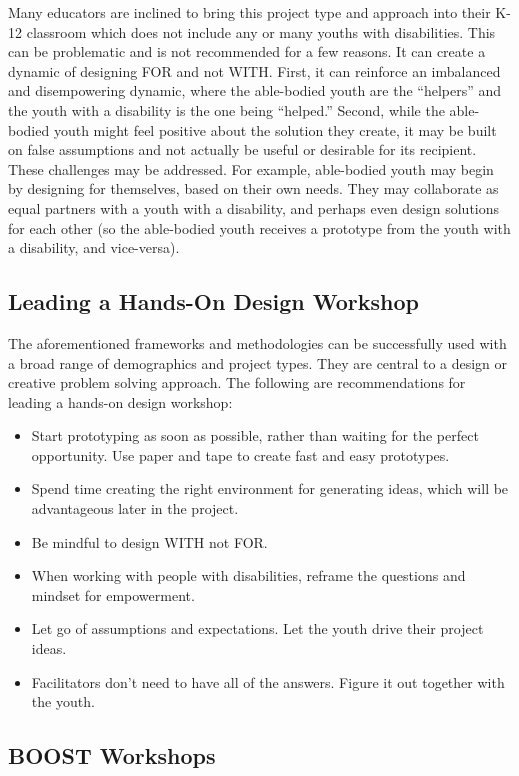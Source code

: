 \documentclass[11.5pt]{sig-alternate} %
\begin{document}
\begin{large}
Many educators are inclined to bring this project type and approach into their K-12 classroom which does not include any or many youths with disabilities. This can be problematic and is not recommended for a few reasons. It can create a dynamic of designing FOR and not WITH. 
First, it can reinforce an imbalanced and disempowering dynamic, where the able-bodied youth are the “helpers” and the youth with a disability is the one being “helped.” Second, while the able-bodied youth might feel positive about the solution they create, it may be built on false assumptions and not actually be useful or desirable for its recipient. 
These challenges may be addressed. For example, able-bodied youth may begin by designing for themselves, based on their own needs. They may collaborate as equal partners with a youth with a disability, and perhaps even design solutions for each other (so the able-bodied youth receives a prototype from the youth with a disability, and vice-versa).  

\subsection*{Leading a Hands-On Design Workshop}

The aforementioned frameworks and methodologies can be successfully used with a broad range of demographics and project types. They are central to a design or creative problem solving approach.  
The following are recommendations for leading a hands-on design workshop:
\begin{itemize}
\item 	Start prototyping as soon as possible, rather than waiting for the perfect opportunity. Use paper and tape to create fast and easy prototypes. 
\item 	Spend time creating the right environment for generating ideas, which will be advantageous later in the project. 
\item 	Be mindful to design WITH not FOR. 
\item 	When working with people with disabilities, reframe the questions and mindset for empowerment.
\item 	Let go of assumptions and expectations. Let the youth drive their project ideas. 
\item 	Facilitators don’t need to have all of the answers. Figure it out together with the youth.
\end{itemize}

\subsection*{BOOST Workshops}


\end{large}
\end{document}

